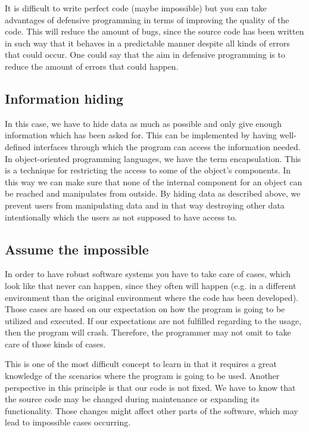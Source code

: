\documentclass[10pt,a4paper]{article}
\begin{document}
It is difficult to write perfect code (maybe impossible) but you can take advantages of defensive programming in terms of improving the quality of the code. This will reduce the amount of bugs, since the source code has been written in such way that it behaves in a predictable manner despite all kinds of errors that could occur.
One could say that the aim in defensive programming is to reduce the amount of errors that could happen.

\subsection{Information hiding}

In this case, we have to hide data as much as possible and only give enough information which has been asked for.
This can be implemented by having well-defined interfaces through which the program can access the information needed.
In object-oriented programming languages, we have the term encapsulation. This is a technique for restricting the access to some of the object’s components. In this way we can make sure that none of the internal component for an object can be reached and manipulates from outside.
By hiding data as described above, we prevent users from manipulating data and in that way destroying other data intentionally which the users as not supposed to have access to.

\subsection{Assume the impossible}

In order to have robust software systems you have to take care of cases, which look like that never can happen, since they often will happen (e.g. in a different environment than the original environment where the code has been developed). Those cases are based on our expectation on how the program is going to be utilized and executed. If our expectations are not fulfilled regarding to the usage, then the program will crash. Therefore, the programmer may not omit to take care of those kinds of cases.
 
This is one of the most difficult concept to learn in that it requires a great knowledge of the scenarios where the program is going to be used.
Another perspective in this principle is that our code is not fixed. We have to know that the source code may be changed during maintenance or expanding its functionality. Those changes might affect other parts of the software, which may lead to impossible cases occurring. 
\end{document}
